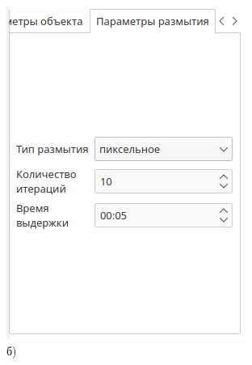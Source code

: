 \begin{figure}[h!]
\begin{minipage}[h]{0.32\linewidth}
{            \includegraphics[width=\linewidth]{img/gui/tab2.png} \\ б)
            }
    \end{minipage}
    \hfill
    \begin{minipage}[h]{0.32\linewidth}
        \center{
}
\end{minipage}
\end{figure}
